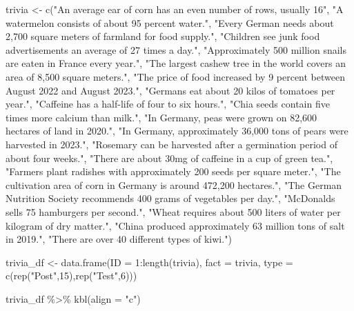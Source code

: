 \documentclass[
  letterpaper,
  DIV=11,
  numbers=noendperiod]{scrartcl}
\newenvironment{Shaded}{\begin{snugshade}}{\end{snugshade}}
\newcommand{\AttributeTok}[1]{\textcolor[rgb]{0.40,0.45,0.13}{#1}}
\newcommand{\DecValTok}[1]{\textcolor[rgb]{0.68,0.00,0.00}{#1}}
\newcommand{\FunctionTok}[1]{\textcolor[rgb]{0.28,0.35,0.67}{#1}}
\newcommand{\NormalTok}[1]{\textcolor[rgb]{0.00,0.23,0.31}{#1}}
\newcommand{\OtherTok}[1]{\textcolor[rgb]{0.00,0.23,0.31}{#1}}
\newcommand{\SpecialCharTok}[1]{\textcolor[rgb]{0.37,0.37,0.37}{#1}}
\newcommand{\StringTok}[1]{\textcolor[rgb]{0.13,0.47,0.30}{#1}}
\begin{document}
\begin{Shaded}
\begin{Highlighting}[]
\NormalTok{trivia }\OtherTok{\textless{}{-}} \FunctionTok{c}\NormalTok{(}\StringTok{"An average ear of corn has an even number of rows, usually 16"}\NormalTok{,}
  \StringTok{"A watermelon consists of about 95 percent water."}\NormalTok{,}
  \StringTok{"Every German needs about 2,700 square meters of farmland for food supply."}\NormalTok{,}
  \StringTok{"Children see junk food advertisements an average of 27 times a day."}\NormalTok{,}
  \StringTok{"Approximately 500 million snails are eaten in France every year."}\NormalTok{,}
  \StringTok{"The largest cashew tree in the world covers an area of 8,500 square meters."}\NormalTok{,}
  \StringTok{"The price of food increased by 9 percent between August 2022 and August 2023."}\NormalTok{,}
  \StringTok{"Germans eat about 20 kilos of tomatoes per year."}\NormalTok{,}
  \StringTok{"Caffeine has a half{-}life of four to six hours."}\NormalTok{,}
  \StringTok{"Chia seeds contain five times more calcium than milk."}\NormalTok{,}
  \StringTok{"In Germany, peas were grown on 82,600 hectares of land in 2020."}\NormalTok{,}
  \StringTok{"In Germany, approximately 36,000 tons of pears were harvested in 2023."}\NormalTok{,}
  \StringTok{"Rosemary can be harvested after a germination period of about four weeks."}\NormalTok{,}
  \StringTok{"There are about 30mg of caffeine in a cup of green tea."}\NormalTok{,}
  \StringTok{"Farmers plant radishes with approximately 200 seeds per square meter."}\NormalTok{,}
  \StringTok{"The cultivation area of corn in Germany is around 472,200 hectares."}\NormalTok{,}
  \StringTok{"The German Nutrition Society recommends 400 grams of vegetables per day."}\NormalTok{,}
  \StringTok{"McDonald\textquotesingle{}s sells 75 hamburgers per second."}\NormalTok{,}
  \StringTok{"Wheat requires about 500 liters of water per kilogram of dry matter."}\NormalTok{,}
  \StringTok{"China produced approximately 63 million tons of salt in 2019."}\NormalTok{,}
  \StringTok{"There are over 40 different types of kiwi."}\NormalTok{)}


\NormalTok{trivia\_df }\OtherTok{\textless{}{-}} \FunctionTok{data.frame}\NormalTok{(}\AttributeTok{ID   =} \DecValTok{1}\SpecialCharTok{:}\FunctionTok{length}\NormalTok{(trivia),}
                        \AttributeTok{fact =}\NormalTok{ trivia,}
                        \AttributeTok{type =} \FunctionTok{c}\NormalTok{(}\FunctionTok{rep}\NormalTok{(}\StringTok{"Post"}\NormalTok{,}\DecValTok{15}\NormalTok{),}\FunctionTok{rep}\NormalTok{(}\StringTok{"Test"}\NormalTok{,}\DecValTok{6}\NormalTok{)))}


\NormalTok{trivia\_df }\SpecialCharTok{\%\textgreater{}\%} \FunctionTok{kbl}\NormalTok{(}\AttributeTok{align =} \StringTok{"c"}\NormalTok{)}
\end{Highlighting}
\end{Shaded}
\end{document}
